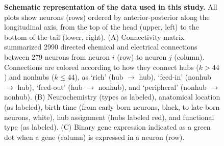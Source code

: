\documentclass[10pt,letterpaper]{article}
\begin{document}
\begin{figure}[h]
  \centering
 \caption{\textbf{Schematic representation of the data used in this study.}
All plots show neurons (rows) ordered by anterior-posterior along the longitudinal axis, from the top of the head (upper, left) to the bottom of the tail (lower, right).
(A) Connectivity matrix summarized 2990 directed chemical and electrical connections between 279 neurons from neuron $i$ (row) to neuron $j$ (column).
Connections are colored according to how they connect hubs ($k > 44$) and nonhubs ($k \leq 44$), as `rich' (hub $\rightarrow$ hub), `feed-in' (nonhub $\rightarrow$ hub), `feed-out' (hub $\rightarrow$ nonhub), and `peripheral' (nonhub $\rightarrow$ nonhub).
(B) Neurochemistry (types as labeled), anatomical location (as labeled), birth time (from early born neurons, black, to late-born neurons, white), hub assignment (hubs labeled red), and functional type (as labeled).
(C) Binary gene expression indicated as a green dot when a gene (column) is expressed in a neuron (row).
}
\label{fig:Fig1}
\end{figure}
\end{document}
